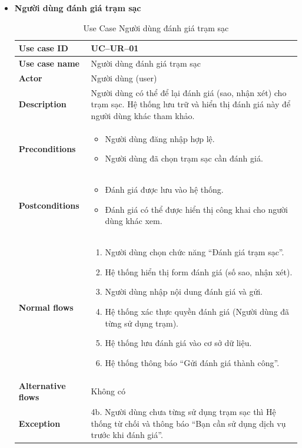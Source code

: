 \begin{itemize}
\item \textbf{Người dùng đánh giá trạm sạc}
\begin{longtable}{|m{}|m{}|}
          \caption{Use Case Người dùng đánh giá trạm sạc} \\
  \hline
  \textbf{Use case ID} & UC--UR--01 \\
  \hline
  \textbf{Use case name} & Người dùng đánh giá trạm sạc \\
  \hline
  \textbf{Actor} & Người dùng (user) \\
  \hline
  \textbf{Description} & Người dùng có thể để lại đánh giá (sao, nhận xét) cho trạm sạc. Hệ thống lưu trữ và hiển thị đánh giá này để người dùng khác tham khảo. \\
  \hline
  \textbf{Preconditions} &
  \begin{itemize}
    \item Người dùng đăng nhập hợp lệ.
    \item Người dùng đã chọn trạm sạc cần đánh giá.
  \end{itemize}\\
  \hline
  \textbf{Postconditions} &
  \begin{itemize}
    \item Đánh giá được lưu vào hệ thống.
    \item Đánh giá có thể được hiển thị công khai cho người dùng khác xem.
  \end{itemize}\\
  \hline
  \textbf{Normal flows} &
  \begin{enumerate}[label=\arabic*.]
    \item Người dùng chọn chức năng “Đánh giá trạm sạc”.
    \item Hệ thống hiển thị form đánh giá (số sao, nhận xét).
    \item Người dùng nhập nội dung đánh giá và gửi.
    \item Hệ thống xác thực quyền đánh giá (Người dùng đã từng sử dụng trạm).
    \item Hệ thống lưu đánh giá vào cơ sở dữ liệu.
    \item Hệ thống thông báo “Gửi đánh giá thành công”.
  \end{enumerate}\\
  \hline
  \textbf{Alternative flows} & Không có\\
  \hline
  \textbf{Exception} &
  4b. Người dùng chưa từng sử dụng trạm sạc thì Hệ thống từ chối và thông báo “Bạn cần sử dụng dịch vụ trước khi đánh giá”.\\
  \hline
  \end{longtable}


\end{itemize}
